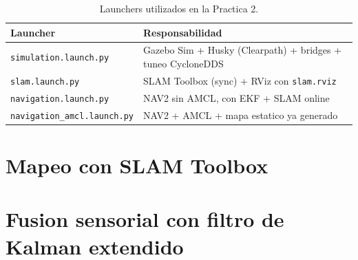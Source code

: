 \documentclass[11pt,a4paper]{article}
\begin{document}
\begin{table}[H]
  \centering
  \caption{Launchers utilizados en la Practica 2.}
  \label{tab:launchers}
  \begin{tabularx}{\linewidth}{lX}
    \toprule
    Launcher & Responsabilidad \\
    \midrule
    \texttt{simulation.launch.py}      & Gazebo Sim + Husky (Clearpath) + bridges + tuneo CycloneDDS \\
    \texttt{slam.launch.py}            & SLAM Toolbox (sync) + RViz con \texttt{slam.rviz} \\
    \texttt{navigation.launch.py}      & NAV2 sin AMCL, con EKF + SLAM online \\
    \texttt{navigation\_amcl.launch.py}& NAV2 + AMCL + mapa estatico ya generado \\
    \bottomrule
  \end{tabularx}
\end{table}


\section{Mapeo con SLAM Toolbox}
\label{sec:slam}




\section{Fusion sensorial con filtro de Kalman extendido}
\label{sec:ekf}
\end{document}
